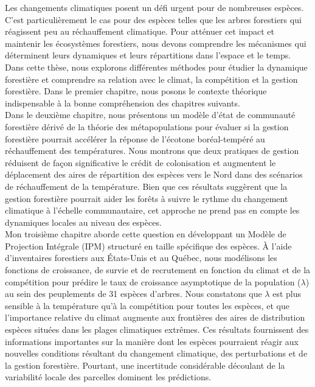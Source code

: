 Les changements climatiques posent un défi urgent pour de nombreuses espèces. C'est particulièrement le cas pour des espèces telles que les arbres forestiers qui réagissent peu au réchauffement climatique. Pour atténuer cet impact et maintenir les écosystèmes forestiers, nous devons comprendre les mécanismes qui déterminent leurs dynamiques et leurs répartitions dans l'espace et le temps. Dans cette thèse, nous explorons différentes méthodes pour étudier la dynamique forestière et comprendre sa relation avec le climat, la compétition et la gestion forestière. 
Dans le premier chapitre, nous posons le contexte théorique indispensable à la bonne compréhension des chapitres suivants.\\

Dans le deuxième chapitre, nous présentons un modèle d'état de communauté forestière dérivé de la théorie des métapopulations pour évaluer si la gestion forestière pourrait accélérer la réponse de l'écotone boréal-tempéré au réchauffement des températures. Nous montrons que deux pratiques de gestion réduisent de façon significative le crédit de colonisation et augmentent le déplacement des aires de répartition des espèces vers le Nord dans des scénarios de réchauffement de la température. Bien que ces résultats suggèrent que la gestion forestière pourrait aider les forêts à suivre le rythme du changement climatique à l'échelle communautaire, cet approche ne prend pas en compte les dynamiques locales au niveau des espèces.\\

Mon troisième chapitre aborde cette question en développant un Modèle de Projection Intégrale (IPM) structuré en taille spécifique des espèces. À l'aide d'inventaires forestiers aux États-Unis et au Québec, nous modélisons les fonctions de croissance, de survie et de recrutement en fonction du climat et de la compétition pour prédire le taux de croissance asymptotique de la population ($\lambda$) au sein des peuplements de 31 espèces d'arbres. Nous constatons que $\lambda$ est plus sensible à la température qu'à la compétition pour toutes les espèces, et que l'importance relative du climat augmente aux frontières des aires de distribution espèces situées dans les plages climatiques extrêmes. Ces résultats fournissent des informations importantes sur la manière dont les espèces pourraient réagir aux nouvelles conditions résultant du changement climatique, des perturbations et de la gestion forestière. Pourtant, une incertitude considérable découlant de la variabilité locale des parcelles dominent les prédictions.\\

